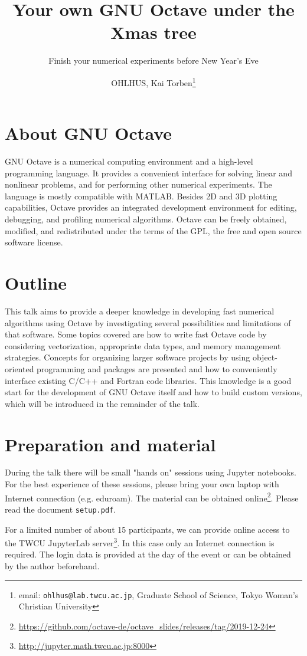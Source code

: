 \documentclass{scrartcl}
\title{Your own GNU Octave under the Xmas tree}
\subtitle{Finish your numerical experiments before New Year's Eve}
\author{OHLHUS, Kai Torben\footnote{email: \texttt{ohlhus@lab.twcu.ac.jp},
Graduate School of Science,
Tokyo Woman's Christian University}}
\begin{document}
\maketitle

\section*{About GNU Octave}

GNU Octave is a numerical computing environment
and a high-level programming language.
It provides a convenient interface for solving linear and nonlinear problems,
and for performing other numerical experiments.
The language is mostly compatible with MATLAB.
Besides 2D and 3D plotting capabilities,
Octave provides an integrated development environment for editing,
debugging, and profiling numerical algorithms.
Octave can be freely obtained, modified, and redistributed
under the terms of the GPL, the free and open source software license.

\section*{Outline}

This talk aims to provide a deeper knowledge in developing
fast numerical algorithms using Octave by investigating several possibilities
and limitations of that software.
Some topics covered are how to write fast Octave code by considering
vectorization, appropriate data types, and memory management strategies.
Concepts for organizing larger software projects
by using object-oriented programming and packages are presented
and how to conveniently interface existing C/C++ and Fortran code libraries.
This knowledge is a good start for the development of GNU Octave itself
and how to build custom versions,
which will be introduced in the remainder of the talk.

\section*{Preparation and material}

During the talk there will be small "hands on" sessions using Jupyter notebooks.
For the best experience of these sessions,
please bring your own laptop with Internet connection (e.g. eduroam).
The material can be obtained online\footnote{\url{https://github.com/octave-de/octave_slides/releases/tag/2019-12-24}}.
Please read the document \texttt{setup.pdf}.

For a limited number of about 15 participants,
we can provide online access to the TWCU JupyterLab server\footnote{\url{http://jupyter.math.twcu.ac.jp:8000}}.
In this case only an Internet connection is required.
The login data is provided at the day of the event
or can be obtained by the author beforehand.
\end{document}
